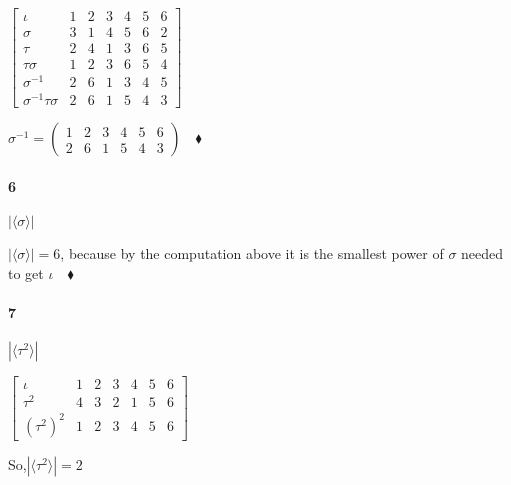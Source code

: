 \documentclass{article}
\begin{document}
$\begin{bmatrix}
 \iota&                 1&2&3&4&5&6\\
 \sigma&                3&1&4&5&6&2\\
 \tau&                  2&4&1&3&6&5\\
 \tau\sigma&            1&2&3&6&5&4 \\
 \sigma^{-1}&           2&6&1&3&4&5\\
 \sigma^{-1}\tau\sigma& 2&6&1&5&4&3
\end{bmatrix}$

$\sigma^{-1} = \begin{pmatrix}
  1&2&3&4&5&6\\2&6&1&5&4&3\end{pmatrix}\quad \blacklozenge$

\newpage
\paragraph{6} $|\langle{\sigma}  \rangle|$

 $|\langle{\sigma}  \rangle| = 6$, because by the
computation above
it is the smallest power of $\sigma$ needed to get
$\iota\quad \blacklozenge$


\paragraph{7} $|\langle \tau^2 \rangle|$


$\begin{bmatrix}
 \iota&                 1&2&3&4&5&6\\
 \tau^2&                4&3&2&1&5&6\\
 (\tau^2)^2&            1&2&3&4&5&6
\end{bmatrix}$

So,$|\langle \tau^2 \rangle|=2$
\end{document}
